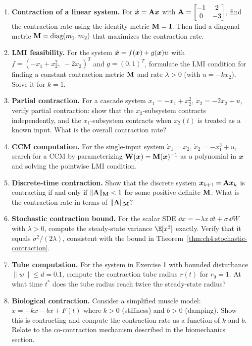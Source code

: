 \begin{enumerate}
\item \textbf{Contraction of a linear system.}
      For $\dot{\bm{x}} = \mathbf{A}\bm{x}$ with $\mathbf{A} = \begin{bmatrix} -1 & 2 \\ 0 & -3 \end{bmatrix}$,
      find the contraction rate using the identity metric $\mathbf{M} = \mathbf{I}$. Then find a
      diagonal metric $\mathbf{M} = \text{diag}(m_1, m_2)$ that maximizes the contraction rate.

\item \textbf{LMI feasibility.}
      For the system $\dot{\bm{x}} = f(\bm{x}) + g(\bm{x})u$ with
      $f = (-x_1 + x_2^2,\; -2x_2)^T$ and $g = (0, 1)^T$, formulate the LMI condition
      for finding a constant contraction metric $\mathbf{M}$ and rate $\lambda > 0$
      (with $u = -kx_2$). Solve it for $k = 1$.

\item \textbf{Partial contraction.}
      For a cascade system $\dot{x}_1 = -x_1 + x_2^2$, $\dot{x}_2 = -2x_2 + u$,
      verify partial contraction: show that the $x_2$-subsystem contracts independently,
      and the $x_1$-subsystem contracts when $x_2(t)$ is treated as a known input.
      What is the overall contraction rate?

\item \textbf{CCM computation.}
      For the single-input system $\dot{x}_1 = x_2$, $\dot{x}_2 = -x_1^3 + u$,
      search for a CCM by parameterizing $\mathbf{W}(\bm{x}) = \mathbf{M}(\bm{x})^{-1}$ as a polynomial
      in $\bm{x}$ and solving the pointwise LMI condition.

\item \textbf{Discrete-time contraction.}
      Show that the discrete system $\bm{x}_{k+1} = \mathbf{A}\bm{x}_k$ is contracting if and only if
      $\|\mathbf{A}\|_{\mathbf{M}} < 1$ for some positive definite $\mathbf{M}$. What is the
      contraction rate in terms of $\|\mathbf{A}\|_{\mathbf{M}}$?

\item \textbf{Stochastic contraction bound.}
      For the scalar SDE $\dd x = -\lambda x \,\dd t + \sigma \,\dd W$ with $\lambda > 0$,
      compute the steady-state variance $\E[x^2]$ exactly. Verify that it equals
      $\sigma^2 / (2\lambda)$, consistent with the bound in Theorem~\ref{thm:ch4:stochastic-contraction}.

\item \textbf{Tube computation.}
      For the system in Exercise 1 with bounded disturbance $\|w\| \leq d = 0.1$,
      compute the contraction tube radius $r(t)$ for $r_0 = 1$. At what time $t^*$
      does the tube radius reach twice the steady-state radius?

\item \textbf{Biological contraction.}
      Consider a simplified muscle model: $\dot{x} = -kx - b\dot{x} + F(t)$ where
      $k > 0$ (stiffness) and $b > 0$ (damping). Show this is contracting and compute
      the contraction rate as a function of $k$ and $b$. Relate to the co-contraction
      mechanism described in the biomechanics section.
\end{enumerate}
